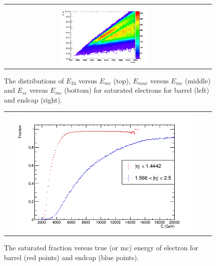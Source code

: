 \begin{figure}[bh]
\begin{center}
\begin{tabular}{cc}
      \includegraphics[width=0.45\textwidth]{chapters/Zprime/Saturation/images/FlatPt/Sample_variables/Emc_Esc_Endcap.png} \\
    \end{tabular}
    \caption{The distributions of $E_{24}$ versus $E_{mc}$ (top), $E_{max}$ versus $E_{mc}$ (middle) and $E_{sc}$ versus $E_{mc}$ (bottom) for saturated electrons for barrel (left) and endcap (right).}
    \label{fig:Esc_Emc}
  \end{center}
\end{figure}

\begin{figure}[bh]
  \begin{center}
    \begin{tabular}{cc}
      \includegraphics[width=0.9\textwidth]{chapters/Zprime/Saturation/images/FlatPt/Sample_variables/Barrel_Endcap_fraction.png}
    \end{tabular}
    \caption{The saturated fraction versus true (or mc) energy of electron for barrel (red points) and endcap (blue points).}
    \label{fig:S_Fraction}
  \end{center}
\end{figure}

